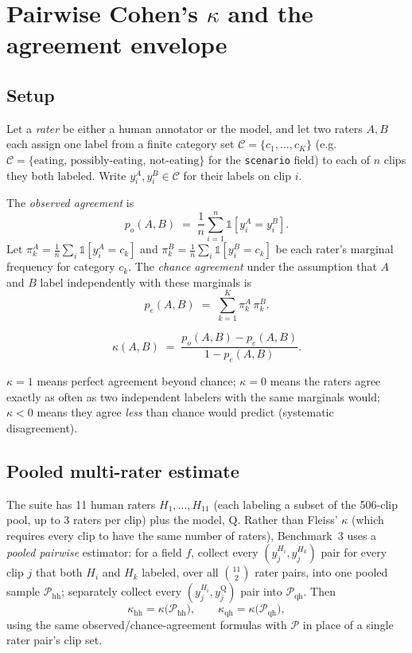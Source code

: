 \section{Pairwise Cohen's $\kappa$ and the agreement envelope}
\label{sec:kappa}

\subsection{Setup}

Let a \emph{rater} be either a human annotator or the model, and let two
raters $A,B$ each assign one label from a finite category set
$\mathcal{C} = \{c_1,\dots,c_K\}$ (e.g.\ $\mathcal{C} =
\{\text{eating},\,\text{possibly-eating},\,\text{not-eating}\}$ for the
\texttt{scenario} field) to each of $n$ clips they both labeled. Write
$y^A_i, y^B_i \in \mathcal{C}$ for their labels on clip $i$.

\begin{definition}
The \emph{observed agreement} is
\[
  p_o(A,B) \;=\; \frac{1}{n}\sum_{i=1}^n \mathbb{1}\!\left[y^A_i = y^B_i\right].
\]
Let $\pi^A_k = \frac{1}{n}\sum_i \mathbb{1}[y^A_i = c_k]$ and
$\pi^B_k = \frac{1}{n}\sum_i \mathbb{1}[y^B_i = c_k]$ be each rater's
marginal frequency for category $c_k$. The \emph{chance agreement} under
the assumption that $A$ and $B$ label independently with these marginals is
\[
  p_e(A,B) \;=\; \sum_{k=1}^K \pi^A_k\, \pi^B_k .
\]
\end{definition}

\begin{definition}
\[
  \kappa(A,B) \;=\; \frac{p_o(A,B) - p_e(A,B)}{1 - p_e(A,B)} .
\]
\end{definition}

$\kappa = 1$ means perfect agreement beyond chance; $\kappa = 0$ means the
raters agree exactly as often as two independent labelers with the same
marginals would; $\kappa < 0$ means they agree \emph{less} than chance
would predict (systematic disagreement).

\subsection{Pooled multi-rater estimate}

The suite has 11 human raters $H_1,\dots,H_{11}$ (each labeling a subset of
the 506-clip pool, up to 3 raters per clip) plus the model, $\mathrm{Q}$.
Rather than Fleiss' $\kappa$ (which requires every clip to have the same
number of raters), Benchmark~3 uses a \emph{pooled pairwise} estimator: for
a field $f$, collect every $(y^{H_i}_j, y^{H_k}_j)$ pair for every clip $j$
that both $H_i$ and $H_k$ labeled, over all $\binom{11}{2}$ rater pairs,
into one pooled sample $\mathcal{P}_{\mathrm{hh}}$; separately collect every
$(y^{H_i}_j, y^{\mathrm{Q}}_j)$ pair into $\mathcal{P}_{\mathrm{qh}}$. Then
\[
  \kappa_{\mathrm{hh}} = \kappa\big(\mathcal{P}_{\mathrm{hh}}\big), \qquad
  \kappa_{\mathrm{qh}} = \kappa\big(\mathcal{P}_{\mathrm{qh}}\big),
\]
using the same observed/chance-agreement formulas with $\mathcal{P}$ in
place of a single rater pair's clip set.

